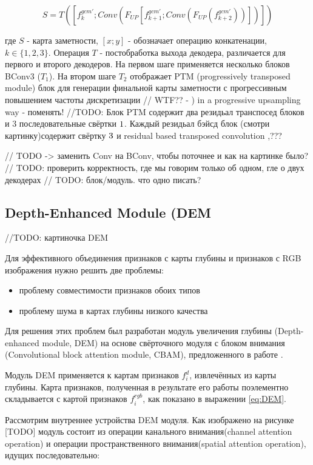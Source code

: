 \begin{equation}
    S = T([f_k^{gcm'}; Conv(F_{UP}[f_{k+1}^{gcm'}; Conv(F_{UP}(f_{k+2}^{gcm'}))])])
\end{equation}

где $S$ - карта заметности, $[x; y]$ - обозначает операцию конкатенации, $k \in \{1,2,3\}$. Операция $T$ - постобработка выхода декодера,
различается для первого и второго декодеров. На первом шаге применяется несколько блоков BConv3 ($T_1$). На втором шаге $T_2$ отображает 
PTM (progressively transposed module) блок для генерации финальной карты заметности с прогрессивным повышением частоты дискретизации // WTF?? - ) in a progressive upsampling way - поменять!
//TODO: Блок PTM содержит два резидьал  транспосед блоков и 3 последовательные свёртки $1 \time 1$. Каждый резидьал бэйсд блок (смотри картинку)содержит свёртку $3 \time 3$
и residual based transposed convolution ,???


// TODO -> заменить Conv на BConv, чтобы поточнее и как на картинке было?
// TODO: проверить корректность, где мы говорим только об одном, гле о двух декодерах
// TODO: блок/модуль. что одно писать? 


\subsection{Depth-Enhanced Module (DEM}

//TODO: картиночка DEM

Для эффективного объединения признаков с карты глубины и признаков с RGB изображения нужно решить две проблемы:

\begin{itemize}
    \item проблему совместимости признаков обоих типов 
    \item проблему шума в картах глубины низкого качества 
\end{itemize}

Для решения этих проблем был разработан  модуль увеличения глубины (Depth-enhanced module, DEM) на основе
свёрточного модуля с блоком внимания (Convolutional block attention module, CBAM), предложенного в работе \cite{Cbam}.

Модуль DEM применяется к картам признаков $f_i^d$, извлечённых из карты глубины. Карта признаков, полученная в результате его работы
поэлементно складывается с картой признаков $f_i^{rgb}$, как показано в выражении \eqref{eq:DEM}.

Рассмотрим внутреннее устройства DEM модуля. Как изображено на рисунке [TODO] модуль состоит из
операции канального внимания(channel attention operation) и операции пространственного внимания(spatial attention operation), идущих последовательно:

